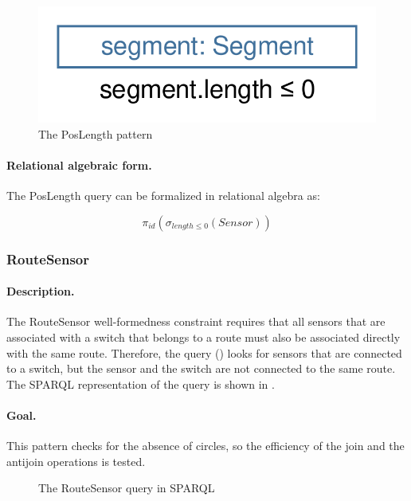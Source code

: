 \begin{figure}[Htb]
		\centering
		\includegraphics[scale=0.4]{figures/trainbenchmark-poslength}
		\caption{The \textsf{PosLength} pattern}
		\label{fig:trainbenchmark-poslength}
\end{figure}

\paragraph{Relational algebraic form.} The \textsf{PosLength} query can be formalized in relational algebra as:

$$ \pi_{\mathit{id}} \left( \sigma_{\mathit{length} \leq 0} \left( \mathit{Sensor} \right) \right) $$

\subsubsection{RouteSensor}

\paragraph{Description.} The \textsf{RouteSensor} well-formedness constraint requires that all sensors that are associated with a switch that belongs to a route must also be associated directly with the same route. Therefore, the query () looks for sensors that are connected to a switch, but the sensor and the switch are not connected to the same route. The SPARQL representation of the query is shown in .

\paragraph{Goal.} This pattern checks for the absence of circles, so the efficiency of the join and the antijoin operations is tested.

\begin{figure}[Htb]
\centering
\begin{minipage}{0.6\textwidth}
  { \alignListing
    }
  \caption{The \textsf{RouteSensor} query in SPARQL}
  \label{lst:routesensor-sparql-nac}
\end{minipage}
\end{figure}

